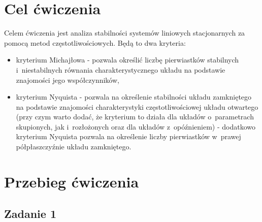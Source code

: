 \documentclass{sprawozdanie-agh}
\begin{document}

\stronatytulowa{}

\section{Cel ćwiczenia}
Celem ćwiczenia jest analiza stabilności systemów liniowych stacjonarnych za pomocą metod częstotliwościowych.
Będą to dwa kryteria:
\begin{itemize}
    \item kryterium Michajłowa - pozwala określić liczbę pierwiastków stabilnych i~niestabilnych równania charakterystycznego układu na podstawie znajomości jego współczynników,
    \item kryterium Nyquista - pozwala na określenie stabilności układu zamkniętego na podstawie znajomości charakterystyki częstotliwościowej układu otwartego (przy czym warto dodać, że kryterium to działa dla układów o~parametrach skupionych, jak i~rozłożonych oraz dla układów z~opóźnieniem) - dodatkowo kryterium Nyquista pozwala na określenie liczby pierwiastków w~prawej półpłaszczyźnie układu zamkniętego.
\end{itemize}

\section{Przebieg ćwiczenia}
\subsection{Zadanie 1}
\end{document}
